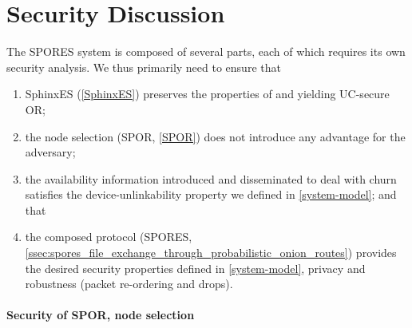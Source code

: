 \section{Security Discussion}%
\label{security-discussion}



The \ac{SPORES} system is composed of several parts, each of which requires its 
own security analysis.
We thus primarily need to ensure that
\begin{enumerate}
\item SphinxES (\cref{SphinxES}) preserves the properties of 
  \textcite{CLOnionRouting} and \textcite{Sphinx} yielding \ac{UC}-secure 
  \ac{OR};
\item the node selection (\ac{SPOR}, \cref{SPOR}) does not introduce any 
  advantage for the adversary;
\item the availability information introduced and disseminated to deal with 
  churn satisfies the device-unlinkability property we defined in 
  \cref{system-model}; and that
\item the composed protocol (\ac{SPORES}, \cref{ssec:spores_file_exchange_through_probabilistic_onion_routes}) provides the desired 
  security properties defined in \cref{system-model}, \ie
  privacy and robustness (packet re-ordering and drops).
\end{enumerate}

\paragraph*{Security of \acs*{SPOR}, node selection}

